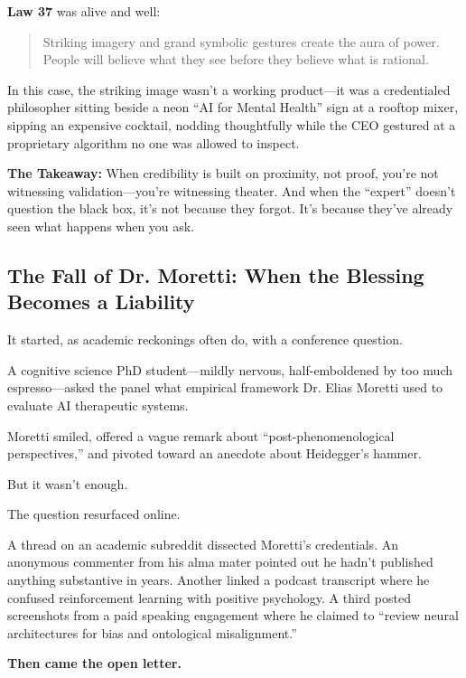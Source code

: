 \medskip

\textbf{Law 37} was alive and well:

\begin{quote}
Striking imagery and grand symbolic gestures create the aura of power. People will believe what they see before 
they believe what is rational.
\end{quote}

In this case, the striking image wasn’t a working product—it was a credentialed philosopher sitting beside a 
neon ``AI for Mental Health'' sign at a rooftop mixer, sipping an expensive cocktail, nodding thoughtfully 
while the CEO gestured at a proprietary algorithm no one was allowed to inspect.

\medskip

\textbf{The Takeaway:}  
When credibility is built on proximity, not proof, you’re not witnessing validation—you’re witnessing theater.  
And when the ``expert'' doesn’t question the black box, it’s not because they forgot.  
It’s because they’ve already seen what happens when you ask.


\subsection{The Fall of Dr. Moretti: When the Blessing Becomes a Liability}

It started, as academic reckonings often do, with a conference question.

A cognitive science PhD student—mildly nervous, half-emboldened by too much espresso—asked the panel what empirical framework Dr. Elias Moretti used to evaluate AI therapeutic systems.

Moretti smiled, offered a vague remark about “post-phenomenological perspectives,” and pivoted toward an anecdote about Heidegger’s hammer.

But it wasn’t enough.

The question resurfaced online.

A thread on an academic subreddit dissected Moretti’s credentials. An anonymous commenter from his alma mater pointed out he hadn’t published anything substantive in years. Another linked a podcast transcript where he confused reinforcement learning with positive psychology. A third posted screenshots from a paid speaking engagement where he claimed to “review neural architectures for bias and ontological misalignment.”

\medskip

\textbf{Then came the open letter.}

